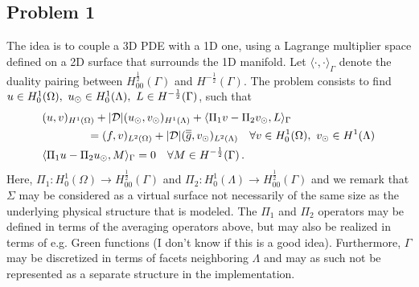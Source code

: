 \documentclass[r]{siamart171218}
\begin{document}
\subsection{Problem 1}
The idea is to couple a 3D PDE with a 1D one, using a Lagrange multiplier space defined on a 2D surface that surrounds the 1D manifold.
Let $\langle \cdot , \cdot \rangle_\Gamma$ denote the duality pairing between 
$H^\frac12_{00}(\Gamma)$ and $H^{-\frac12}(\Gamma)$.
The problem consists to find $u \in H^1_0(\Omega),\ u_{\odot} \in H^1_0(\Lambda), \ L \in H^{-\frac12}(\Gamma )$, such that
\begin{subequations}\label{eq:problem1}
\begin{align}
&(u,v)_{H^1(\Omega)} + |{\cal D}|(\ud,\vd)_{H^1(\Lambda)} 
+ \langle \Pi_1 v  - \Pi_2 \vd, L \rangle_\Gamma
\\
\nonumber
&\qquad\qquad= (f,v)_{L^2(\Omega)} + |{\cal D}| (\avrd{g},\vd)_{L^2(\Lambda)}
\quad \forall v \in H^1_0(\Omega), \ \vd \in H^1(\Lambda)
\\
&   \langle \Pi_1 u - \Pi_2 \ud , M \rangle_\Gamma = 0
\quad \forall M \in H^{-\frac12}(\Gamma)\,.
\end{align}
\end{subequations}
Here, $\Pi_1: H^1_0(\Omega) \rightarrow H^{\frac12}_{00}(\Gamma)$
and $\Pi_2: H^1_0(\Lambda) \rightarrow H^{\frac12}_{00}(\Gamma)$
and we remark that $\Sigma$ may be considered as a virtual surface
not necessarily of the same size as the underlying physical structure that is modeled.  
The $\Pi_1$ and $\Pi_2$ operators may be defined in terms of the averaging operators above, but may also be realized in terms of e.g. Green functions (I don't know if this is a good idea). Furthermore,  $\Gamma$ may be discretized in terms of facets neighboring $\Lambda$ and may as such not be represented as a separate structure in the implementation. 

\end{document}
